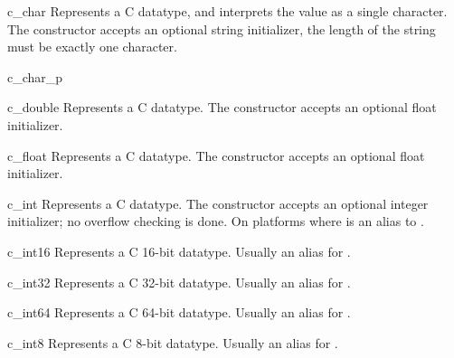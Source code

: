 \begin{classdesc}{c_char}{}
Represents a C  datatype, and interprets the value as a
single character.  The constructor accepts an optional string
initializer, the length of the string must be exactly one character.
\end{classdesc}

\begin{classdesc}{c_char_p}{}
\end{classdesc}

\begin{classdesc}{c_double}{}
Represents a C  datatype.  The constructor accepts an
optional float initializer.
\end{classdesc}

\begin{classdesc}{c_float}{}
Represents a C  datatype.  The constructor accepts an
optional float initializer.
\end{classdesc}

\begin{classdesc}{c_int}{}
Represents a C  datatype.  The constructor accepts an
optional integer initializer; no overflow checking is done.  On
platforms where   is an
alias to .
\end{classdesc}

\begin{classdesc}{c_int16}{}
Represents a C 16-bit  datatype.  Usually an alias
for .
\end{classdesc}

\begin{classdesc}{c_int32}{}
Represents a C 32-bit  datatype.  Usually an alias
for .
\end{classdesc}

\begin{classdesc}{c_int64}{}
Represents a C 64-bit  datatype.  Usually an alias
for .
\end{classdesc}

\begin{classdesc}{c_int8}{}
Represents a C 8-bit  datatype.  Usually an alias for .
\end{classdesc}

